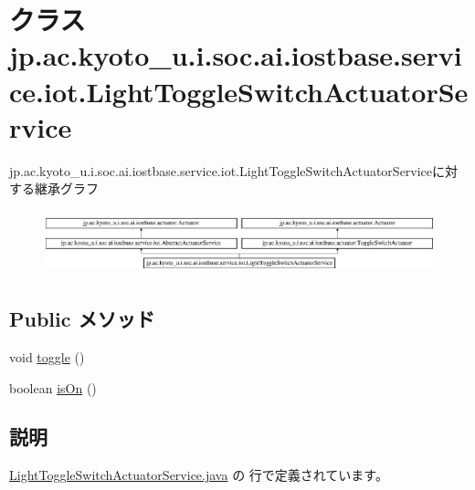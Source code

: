 \hypertarget{classjp_1_1ac_1_1kyoto__u_1_1i_1_1soc_1_1ai_1_1iostbase_1_1service_1_1iot_1_1_light_toggle_switch_actuator_service}{\section{クラス jp.\-ac.\-kyoto\-\_\-u.\-i.\-soc.\-ai.\-iostbase.\-service.\-iot.\-Light\-Toggle\-Switch\-Actuator\-Service}
\label{classjp_1_1ac_1_1kyoto__u_1_1i_1_1soc_1_1ai_1_1iostbase_1_1service_1_1iot_1_1_light_toggle_switch_actuator_service}
}
jp.\-ac.\-kyoto\-\_\-u.\-i.\-soc.\-ai.\-iostbase.\-service.\-iot.\-Light\-Toggle\-Switch\-Actuator\-Serviceに対する継承グラフ\begin{figure}[H]
\begin{center}
\leavevmode
\includegraphics[height=1.858407cm]{classjp_1_1ac_1_1kyoto__u_1_1i_1_1soc_1_1ai_1_1iostbase_1_1service_1_1iot_1_1_light_toggle_switch_actuator_service}
\end{center}
\end{figure}
\subsection*{Public メソッド}
\begin{DoxyCompactItemize}
\item 
void \hyperlink{classjp_1_1ac_1_1kyoto__u_1_1i_1_1soc_1_1ai_1_1iostbase_1_1service_1_1iot_1_1_light_toggle_switch_actuator_service_aad46522e5a535bc11e7a7829c338e856}{toggle} ()
\item 
boolean \hyperlink{classjp_1_1ac_1_1kyoto__u_1_1i_1_1soc_1_1ai_1_1iostbase_1_1service_1_1iot_1_1_light_toggle_switch_actuator_service_a0060495e5edc6beb33cf390dfabc31f9}{is\-On} ()
\end{DoxyCompactItemize}


\subsection{説明}


 \hyperlink{_light_toggle_switch_actuator_service_8java_source}{Light\-Toggle\-Switch\-Actuator\-Service.\-java} の  行で定義されています。



